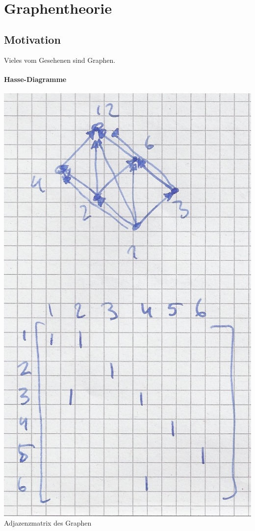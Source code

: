 \chapter{Graphentheorie}
\section{Motivation}
Vieles vom Gesehenen sind Graphen.
\subsubsection{Hasse-Diagramme}
\includegraphics{Bild28} \\
Adjazenzmatrix des Graphen
